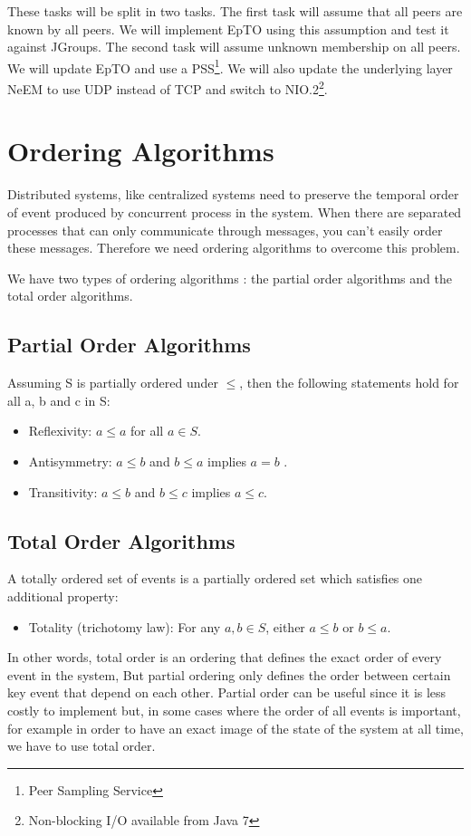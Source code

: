 \documentclass[10pt,conference,a4paper]{IEEEtran}
\begin{document}
These tasks will be split in two tasks. The first task will assume that all peers are known by all peers. We will implement EpTO using this assumption and test it against JGroups. The second task will assume unknown membership on all peers. We will update EpTO and use a PSS\footnote{Peer Sampling Service}. We will also update the underlying layer NeEM \autocite{neem} to use UDP instead of TCP and switch to NIO.2\footnote{Non-blocking I/O available from Java 7}.

\section{Ordering Algorithms}

Distributed systems, like centralized systems need to preserve the temporal order of event produced by concurrent process in the system. When there are separated processes that can only communicate through messages, you can’t easily order these messages.
Therefore we need ordering algorithms to overcome this problem.
\par
We have two types of ordering algorithms \autocite{lamport1978time}: the partial order algorithms and the total order algorithms.
\subsection{Partial Order Algorithms}
Assuming S is partially ordered under $\leq$, then the following statements hold for all a, b and c in S:
\begin{itemize}
	\item Reflexivity: $a \leq a$ for all $a \in S$.
	\item Antisymmetry: $a \leq b$ and $b \leq a$ implies $a=b$ .
	\item Transitivity: $a \leq b$  and $b \leq c$  implies $a \leq c$.
\end{itemize}

\subsection{Total Order Algorithms}
A totally ordered set of events is a partially ordered set which satisfies one additional property:
\begin{itemize}
	\item Totality (trichotomy law): For any $a, b \in S$, either $a \leq b$  or $b \leq a$.
\end{itemize}
\par
In other words, total order is an ordering that defines the exact order of every event in the system, But partial ordering only defines the order between certain key event that depend on each other. Partial order can be useful since it is less costly to implement but, in some cases where the order of all events is important, for example in order to have an exact image of the state of the system at all time, we have to use total order.
\end{document}
